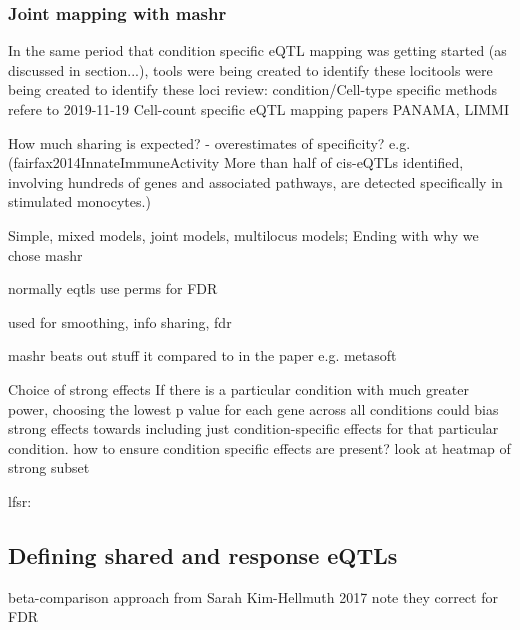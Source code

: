 \subsubsection{Joint mapping with mashr}


In the same period that condition specific eQTL mapping was getting started (as discussed in section...), tools were being created to identify these locitools were being created to identify these loci
review: condition/Cell-type specific methods
refere to 2019-11-19 Cell-count specific eQTL mapping papers
PANAMA, LIMMI

How much sharing is expected?
- overestimates of specificity? e.g. (fairfax2014InnateImmuneActivity More than half of cis-eQTLs identified, involving hundreds of genes and associated pathways, are detected specifically in stimulated monocytes.)

Simple, mixed models, joint models, multilocus models; Ending with why we chose mashr

normally eqtls use perms for FDR

used for smoothing, info sharing, fdr

mashr beats out stuff it compared to in the paper e.g. metasoft

Choice of strong effects
If there is a particular condition with much greater power, choosing the lowest p value for each gene across all conditions could bias strong effects towards including just condition-specific effects for that particular condition.
how to ensure condition specific effects are present? look at heatmap of strong subset

lfsr:


\subsection{Defining shared and response eQTLs}

beta-comparison approach from Sarah Kim-Hellmuth 2017
    note they correct for FDR


